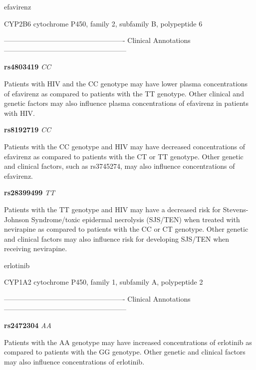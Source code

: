 \documentclass{resume} %
\begin{document}
\begin{rSection}{ efavirenz }
\begin{rSubsection}{ CYP2B6 }{ cytochrome P450, family 2, subfamily B, polypeptide 6 }{}{}
\item[] ---------------------------------------------------- Clinical Annotations -----------------------------------------------------\newline
\item \textbf{ rs4803419 } \textit{ CC }
\item[] Patients with HIV and the CC genotype may have lower plasma concentrations of efavirenz as compared to patients with the TT genotype. Other clinical and genetic factors may also influence plasma concentrations of efavirenz in patients with HIV.\item \textbf{ rs8192719 } \textit{ CC }
\item[] Patients with the CC genotype and HIV may have decreased concentrations of efavirenz as compared to patients with the CT or TT genotype. Other genetic and clinical factors, such as rs3745274, may also influence concentrations of efavirenz. \item \textbf{ rs28399499 } \textit{ TT }
\item[] Patients with the TT genotype and HIV may have a decreased risk for Stevens-Johnson Syndrome/toxic epidermal necrolysis (SJS/TEN) when treated with nevirapine as compared to patients with the CC or CT genotype. Other genetic and clinical factors may also influence risk for developing SJS/TEN when receiving nevirapine.
\end{rSubsection}

\end{rSection}\begin{rSection}{ erlotinib }
\item[]

\begin{rSubsection}{ CYP1A2 }{ cytochrome P450, family 1, subfamily A, polypeptide 2 }{}{}
\item[]

\item[] ---------------------------------------------------- Clinical Annotations -----------------------------------------------------\newline
\item \textbf{ rs2472304 } \textit{ AA }
\item[] Patients with the AA genotype may have increased concentrations of erlotinib as compared to patients with the GG genotype. Other genetic and clinical factors may also influence concentrations of erlotinib.
\end{rSubsection}


\end{rSection}
\end{document}
